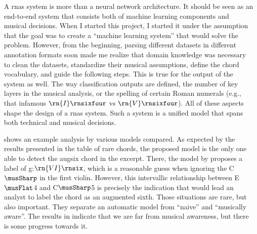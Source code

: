 
A \glspl{rna} system is more than a neural network
architecture. It should be seen as an end-to-end system that
consists both of machine learning components and musical
decisions. When I started this project, I started it under
the assumption that the goal was to create a ``machine
learning system'' that would solve the problem. However,
from the beginning, parsing different datasets in different
annotation formats soon made me realize that domain
knowledge was necessary to clean the datasets, standardize
their musical assumptions, define the chord vocabulary, and
guide the following steps. This is true for the output of
the system as well. The way classification outputs are
defined, the number of key layers in the musical analysis,
or the spelling of certain Roman numerals (e.g., that
infamous $\rn{I}\rnsixfour$ vs $\rn{V}\rnsixfour$). All of
these aspects shape the design of a \glspl{rna} system. Such
a system is a unified model that spans both technical and
musical decisions.

 shows an example analysis by
various models compared. As expected by the results
presented in the table of rare chords, the proposed model is
the only one able to detect the \gls{augsix} chord in the
excerpt. There, the model by \textcite{mcleod2021modular}
proposes a label of g:$\rn{VI}\rnsix$, which is a reasonable
guess when ignoring the C$\musSharp$ in the first violin.
However, this intervallic relationship between E$\musFlat$4
and C$\musSharp$5 is precisely the indication that would
lead an analyst to label the chord as an augmented sixth.
Those situations are rare, but also important. They separate
an automatic model from ``naive'' and ``musically aware''.
The results in  indicate that we are far
from musical awareness, but there is some progress towards
it.

